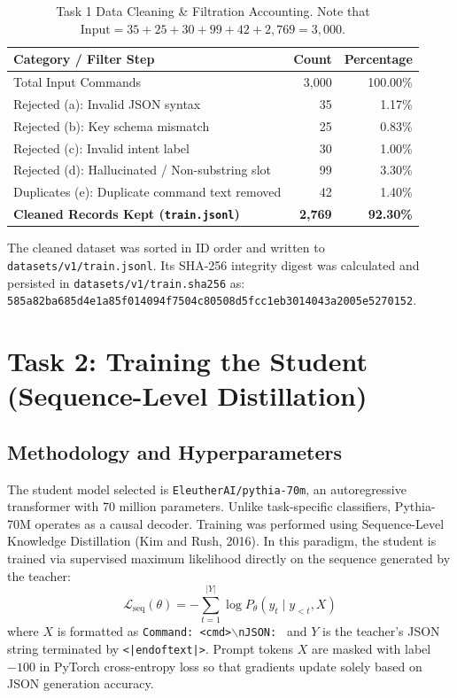 \documentclass[10pt,a4paper]{article}
\begin{document}
\begin{table}[h!]
\centering
\small
\begin{tabular}{lrr}
\toprule
\textbf{Category / Filter Step} & \textbf{Count} & \textbf{Percentage} \\
\midrule
Total Input Commands & 3,000 & 100.00\% \\
Rejected (a): Invalid JSON syntax & 35 & 1.17\% \\
Rejected (b): Key schema mismatch & 25 & 0.83\% \\
Rejected (c): Invalid intent label & 30 & 1.00\% \\
Rejected (d): Hallucinated / Non-substring slot & 99 & 3.30\% \\
Duplicates (e): Duplicate command text removed & 42 & 1.40\% \\
\midrule
\textbf{Cleaned Records Kept (\texttt{train.jsonl})} & \textbf{2,769} & \textbf{92.30\%} \\
\bottomrule
\end{tabular}
\caption{Task 1 Data Cleaning \& Filtration Accounting. Note that $\text{Input} = 35 + 25 + 30 + 99 + 42 + 2,769 = 3,000$.}
\label{tab:cleaning_counts}
\end{table}

The cleaned dataset was sorted in ID order and written to \texttt{datasets/v1/train.jsonl}. Its SHA-256 integrity digest was calculated and persisted in \texttt{datasets/v1/train.sha256} as:
\texttt{585a82ba685d4e1a85f014094f7504c80508d5fcc1eb3014043a2005e5270152}.

\section{Task 2: Training the Student (Sequence-Level Distillation)}
\subsection{Methodology and Hyperparameters}
The student model selected is \texttt{EleutherAI/pythia-70m}, an autoregressive transformer with 70 million parameters. Unlike task-specific classifiers, Pythia-70M operates as a causal decoder. Training was performed using Sequence-Level Knowledge Distillation (Kim and Rush, 2016). In this paradigm, the student is trained via supervised maximum likelihood directly on the sequence generated by the teacher:
\begin{equation}
\mathcal{L}_{\text{seq}}(\theta) = - \sum_{t=1}^{|Y|} \log P_{\theta}(y_t \mid y_{<t}, X)
\end{equation}
where $X$ is formatted as \texttt{Command: <cmd>$\backslash$nJSON: } and $Y$ is the teacher's JSON string terminated by \texttt{<|endoftext|>}. Prompt tokens $X$ are masked with label $-100$ in PyTorch cross-entropy loss so that gradients update solely based on JSON generation accuracy.
\end{document}
